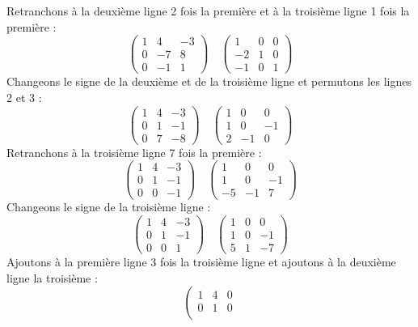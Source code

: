 {	
	Retranchons à la deuxième ligne 2 fois la première et à la troisième ligne 1 fois la première :
	$$
	\left(\begin{array}{ccc}
		1 & 4 & -3 \\
		0 & -7 & 8 \\
		0 & -1 & 1
	\end{array}\right) \quad\left(\begin{array}{ccc}
		1 & 0 & 0 \\
		-2 & 1 & 0 \\
		-1 & 0 & 1
	\end{array}\right)
	$$
	Changeons le signe de la deuxième et de la troisième ligne et permutons les lignes 2 et 3 :
	$$
	\left(\begin{array}{ccc}
		1 & 4 & -3 \\
		0 & 1 & -1 \\
		0 & 7 & -8
	\end{array}\right) \quad\left(\begin{array}{ccc}
		1 & 0 & 0 \\
		1 & 0 & -1 \\
		2 & -1 & 0
	\end{array}\right)
	$$
	Retranchons à la troisième ligne 7 fois la première :
	$$
	\left(\begin{array}{ccc}
		1 & 4 & -3 \\
		0 & 1 & -1 \\
		0 & 0 & -1
	\end{array}\right) \quad\left(\begin{array}{ccc}
		1 & 0 & 0 \\
		1 & 0 & -1 \\
		-5 & -1 & 7
	\end{array}\right)
	$$
	Changeons le signe de la troisième ligne :
	$$
	\left(\begin{array}{ccc}
		1 & 4 & -3 \\
		0 & 1 & -1 \\
		0 & 0 & 1
	\end{array}\right) \quad\left(\begin{array}{ccc}
		1 & 0 & 0 \\
		1 & 0 & -1 \\
		5 & 1 & -7
	\end{array}\right)
	$$
	Ajoutons à la première ligne 3 fois la troisième ligne et ajoutons à la deuxième ligne la troisième :
	$$
	\left(\begin{array}{lll}
		1 & 4 & 0 \\
		0 & 1 & 0 \\

\end{array}$$}

